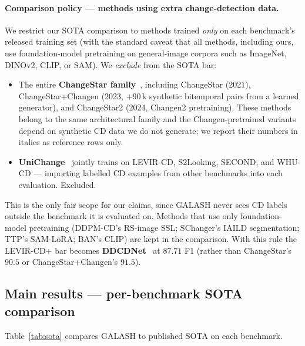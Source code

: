 \paragraph{Comparison policy --- methods using extra change-detection data.}
We restrict our SOTA comparison to methods trained \emph{only} on each
benchmark's released training set (with the standard caveat that all
methods, including ours, use foundation-model pretraining on general-image
corpora such as ImageNet, DINOv2, CLIP, or SAM). We \emph{exclude} from the
SOTA bar:
\begin{itemize}
  \item The entire \textbf{ChangeStar family}~\citep{zheng2022changestar,
    zheng2023changen, zheng2024changestar2}, including ChangeStar (2021),
    ChangeStar+Changen (2023, $+90$\,k synthetic bitemporal pairs from
    a learned generator), and ChangeStar2 (2024, Changen2 pretraining).
    These methods belong to the same architectural family and the
    Changen-pretrained variants depend on synthetic CD data we do not
    generate; we report their numbers in italics as reference rows
    only.
  \item \textbf{UniChange}~\citep{zeng2025unichange} jointly trains on
    LEVIR-CD, S2Looking, SECOND, and WHU-CD --- importing labelled CD
    examples from other benchmarks into each evaluation. Excluded.
\end{itemize}
This is the only fair scope for our claims, since GALASH never sees CD
labels outside the benchmark it is evaluated on. Methods that use only
foundation-model pretraining (DDPM-CD's RS-image SSL; SChanger's IAILD
segmentation; TTP's SAM-LoRA; BAN's CLIP) are kept in the comparison.
With this rule the LEVIR-CD+ bar becomes \textbf{DDCDNet}~\citep{ddcdnet2024}
at $87.71$ F1 (rather than ChangeStar's $90.5$ or ChangeStar+Changen's
$91.5$).

\subsection{Main results --- per-benchmark SOTA comparison}
\label{sec:main-table}

Table~\ref{tab:sota} compares GALASH to published SOTA on each benchmark.


